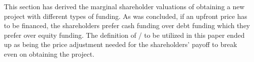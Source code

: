 \documentclass[main.tex]{subfiles}
\begin{document}
    This section has derived the marginal shareholder valuations of obtaining a new project
    with different types of funding.
    As was concluded, if an upfront price has to be financed,
    the shareholders prefer cash funding over debt funding
    which they prefer over equity funding.
    The definition of \FVA/ to be utilized in this paper ended up as being the price adjustment needed
    for the shareholders' payoff to break even on obtaining the project.
\end{document}
